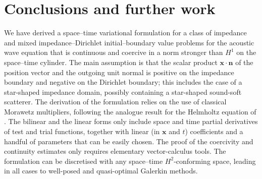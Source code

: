 \documentclass[a4paper]{article}
\theoremstyle{plain}
\theoremstyle{definition}
\newcommand{\vect}[1]{\bm{#1}}
\newcommand{\vx}{{\vect x}}
\newcommand{\vn}{{\vect n}}
\begin{document}
\section{Conclusions and further work}\label{sec:Conclusions}

We have derived a space--time variational formulation for a class of impedance and mixed impedance--Dirichlet initial--boundary value problems for the acoustic wave equation that is continuous and coercive in a norm stronger than $H^1$ on the space--time cylinder.
The main assumption is that the scalar product $\vx\cdot\vn$ of the position vector and the outgoing unit normal is positive on the impedance boundary and negative on the Dirichlet boundary; this includes the case of a star-shaped impedance domain, possibly containing a star-shaped sound-soft scatterer.
The derivation of the formulation relies on the use of classical Morawetz multipliers, following the analogue result for the Helmholtz equation of \cite{Moiola2014}.
The bilinear and the linear forms only include space and time partial derivatives of test and trial functions, together with linear (in $\vx$ and $t$) coefficients and a handful of parameters that can be easily chosen.
The proof of the coercivity and continuity estimates only requires elementary vector-calculus tools.
The formulation can be discretised with any space--time $H^2$-conforming space, leading in all cases to well-posed and quasi-optimal Galerkin methods.
\end{document}
